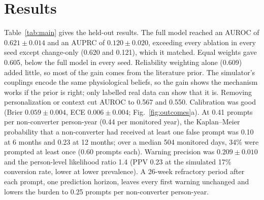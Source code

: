\documentclass[conference]{IEEEtran}
\begin{document}
\section{Results}
Table~\ref{tab:main} gives the held-out results. The full model reached an AUROC of $0.621\pm0.014$ and an AUPRC of $0.120\pm0.020$, exceeding every ablation in every seed except change-only (0.620 and 0.121), which it matched. Equal weights gave 0.605, below the full model in every seed. Reliability weighting alone (0.609) added little, so most of the gain comes from the literature prior. The simulator's couplings encode the same physiological beliefs, so the gain shows the mechanism works if the prior is right; only labelled real data can show that it is. Removing personalization or context cut AUROC to 0.567 and 0.550. Calibration was good (Brier $0.059\pm0.004$, ECE $0.006\pm0.004$; Fig.~\ref{fig:outcomes}a). At 0.41 prompts per non-converter person-year (0.44 per monitored year), the Kaplan--Meier probability that a non-converter had received at least one false prompt was 0.10 at 6 months and 0.23 at 12 months; over a median 504 monitored days, 34\% were prompted at least once (0.60 prompts each). Warning precision was $0.209\pm0.010$ and the person-level likelihood ratio 1.4 (PPV 0.23 at the simulated 17\% conversion rate, lower at lower prevalence). A 26-week refractory period after each prompt, one prediction horizon, leaves every first warning unchanged and lowers the burden to 0.25 prompts per non-converter person-year.
\end{document}
